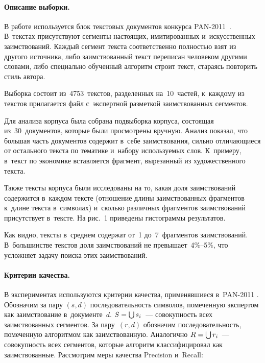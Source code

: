 \begin{multicols}{2}
\paragraph*{Описание выборки.}
В работе используется блок текстовых документов конкурса PAN-2011~\cite{PAN}. 
В~текстах присутствуют сегменты настоящих, имитированных и~искусственных 
заимствований. Каж\-дый сегмент текста соответственно полностью взят из другого 
источника, либо заимствованный текст переписан человеком другими словами, либо 
специально обученный алгоритм строит текст, стараясь повторить стиль автора.

Выборка состоит из~4753~текс\-тов, разделенных на~10~час\-тей, к~каждому из текстов 
прилагается файл с~экспертной разметкой заимствованных сегментов.

Для анализа корпуса была собрана подвыборка корпуса, состоящая из~30~документов, 
которые были просмотрены вручную. Анализ показал, что большая часть документов 
содержит в~себе заимствования, сильно отличающиеся от остального текста по 
тематике и~набору используемых слов. К~примеру, в~текст по экономике вставляется 
фрагмент, вырезанный из художественного текста.

Также тексты корпуса были исследованы на то, какая доля заимствований содержится 
в~каждом текс\-те (отношение длины заимствованных фрагментов к~длине текс\-та 
в~символах) и~сколько различных фрагментов заимствований присутствует в~текс\-те. На 
рис.~1 приведены гистограммы результатов.

Как видно, тексты в~среднем содержат от~1 до~7~фрагментов заимствований. 
В~большинстве текстов доля заимствований не превышает~4\%--5$\%$, что усложняет 
задачу поиска этих заимствований.

\vspace*{-6pt}

\paragraph*{Критерии качества.}
В экспериментах используют\-ся критерии качества, применявшиеся в~PAN-2011 \cite{PAN}. 
Обозначим за пару $(s, d)$ последовательность символов, помеченную 
экспертом как заимствование в~документе~$d$. $S \hm= \bigcup s_{i}$~--- 
совокупность всех заимствованных сегментов. За пару~$(r, d)$ обозначим 
последовательность, помеченную алгоритмом как заимствованную. Аналогично $R \hm= 
\bigcup r_{i}$~--- совокупность всех сегментов, которые алгоритм 
классифицировал как заимствованные. Рас\-смот\-рим меры качества {Precision} 
и~{Recall}:


\end{multicols}
